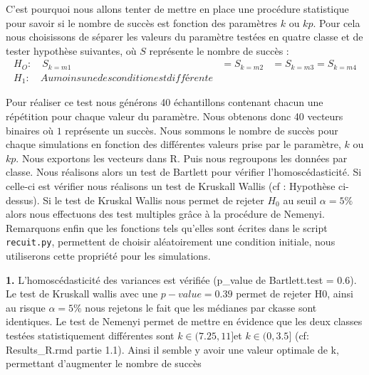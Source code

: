 \documentclass[12pt]{article}
\begin{document}
 
C'est pourquoi nous allons tenter de mettre en place une procédure statistique pour savoir si le nombre de succès est fonction des paramètres $k$ ou $kp$. Pour cela nous choisissons de séparer les valeurs du paramètre  testées en quatre classe et de tester hypothèse suivantes, où $S$ représente le nombre de succès :
\begin{align*}
    H_O : \quad S_{k=m1} &=  S_{k=m2} &=  S_{k=m3} =S_{k=m4}  \\
    H_1 : \quad Au moins une des condition est différente
\end{align*}

Pour réaliser ce test nous générons 40 échantillons contenant chacun une répétition pour chaque valeur du paramètre. Nous obtenons donc 40 vecteurs binaires où $1$ représente un succès. Nous sommons le nombre de succès pour chaque simulations en fonction des différentes valeurs prise par le paramètre, $k$ ou $kp$.  Nous exportons les vecteurs dans R. Puis nous regroupons les données  par classe.   Nous réalisons alors un test de Bartlett pour vérifier l'homoscédasticité. Si celle-ci est vérifier nous réalisons un test de Kruskall Wallis (cf : Hypothèse ci-dessus). Si le test de Kruskal Wallis nous permet de rejeter $H_0$ au seuil $\alpha=5\%$ alors nous effectuons des test multiples grâce à la procédure de Nemenyi.\\
Remarquons enfin que les fonctions tels qu'elles sont écrites dans le script \verb|recuit.py|, permettent de choisir aléatoirement une condition initiale, nous utiliserons cette propriété  pour  les simulations.\\ 
\begin{minipage}{0.5\textwidth}

\textbf{\color{brick}1.} 
L'homoscédasticité des variances est vérifiée (p_value de Bartlett.test = 0.6). Le test de Kruskall wallis avec une $p-value = 0.39$ permet de rejeter H0, ainsi au risque $\alpha=5\%$ nous rejetons le fait que les médianes par ckasse sont identiques. Le test de Nemenyi permet de mettre en évidence que les deux classes testées statistiquement différentes sont $k\in(7.25,11]$et  $k\in(0,3.5]$ (cf: Results\_R.rmd partie 1.1). Ainsi il semble y avoir une valeur optimale de k, permettant d'augmenter le nombre de succès 
\end{minipage} \hfill
\end{document}
